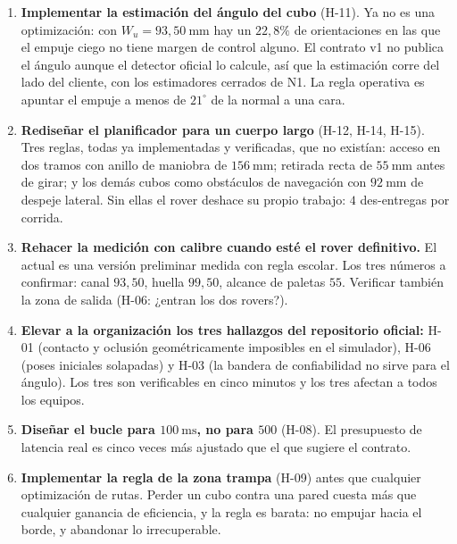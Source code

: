 \documentclass[11pt,a4paper]{article}
\newcommand{\grados}{^{\circ}}
\begin{document}
\begin{enumerate}[label=\textbf{\arabic*.},leftmargin=2.6em,itemsep=6pt]
\item \textbf{Implementar la estimación del ángulo del cubo} (H-11). Ya no es una
      optimización: con $W_u = 93{,}50\ \mathrm{mm}$ hay un $22{,}8\%$ de orientaciones
      en las que el empuje ciego no tiene margen de control alguno. El contrato v1 no
      publica el ángulo aunque el detector oficial lo calcule, así que la estimación
      corre del lado del cliente, con los estimadores cerrados de N1. La regla operativa
      es apuntar el empuje a menos de $21\grados$ de la normal a una cara.

\item \textbf{Rediseñar el planificador para un cuerpo largo} (H-12, H-14, H-15). Tres
      reglas, todas ya implementadas y verificadas, que no existían: acceso en dos tramos
      con anillo de maniobra de $156\ \mathrm{mm}$; retirada recta de $55\ \mathrm{mm}$
      antes de girar; y los demás cubos como obstáculos de navegación con $92\ \mathrm{mm}$
      de despeje lateral. Sin ellas el rover deshace su propio trabajo: $4$ des-entregas
      por corrida.

\item \textbf{Rehacer la medición con calibre cuando esté el rover definitivo.} El actual
      es una versión preliminar medida con regla escolar. Los tres números a confirmar:
      canal $93{,}50$, huella $99{,}50$, alcance de paletas $55$. Verificar también la zona
      de salida (H-06: ¿entran los dos rovers?).

\item \textbf{Elevar a la organización los tres hallazgos del repositorio oficial:}
      H-01 (contacto y oclusión geométricamente imposibles en el simulador), H-06 (poses
      iniciales solapadas) y H-03 (la bandera de confiabilidad no sirve para el ángulo).
      Los tres son verificables en cinco minutos y los tres afectan a todos los equipos.

\item \textbf{Diseñar el bucle para $100\ \mathrm{ms}$, no para $500$} (H-08). El
      presupuesto de latencia real es cinco veces más ajustado que el que sugiere el
      contrato.

\item \textbf{Implementar la regla de la zona trampa} (H-09) antes que cualquier
      optimización de rutas. Perder un cubo contra una pared cuesta más que cualquier
      ganancia de eficiencia, y la regla es barata: no empujar hacia el borde, y
      abandonar lo irrecuperable.


\end{enumerate}
\end{document}
